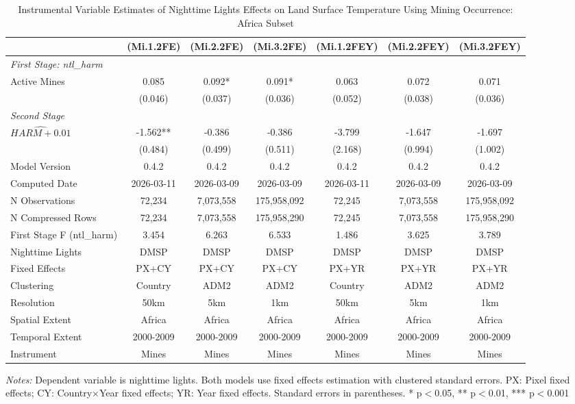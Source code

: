 \begin{table}[htbp]
\centering
\footnotesize
\caption{Instrumental Variable Estimates of Nighttime Lights Effects on Land Surface Temperature Using Mining Occurrence: Africa Subset}
\begin{tabular}{lcccccc}
\toprule
 & (Mi.1.2FE) & (Mi.2.2FE) & (Mi.3.2FE) & (Mi.1.2FEY) & (Mi.2.2FEY) & (Mi.3.2FEY) \\
\midrule
\midrule
\multicolumn{7}{l}{\textit{First Stage: ntl\_harm}} \\
  Active Mines & 0.085 & 0.092* & 0.091* & 0.063 & 0.072 & 0.071 \\
 & (0.046) & (0.037) & (0.036) & (0.052) & (0.038) & (0.036) \\
\midrule
\multicolumn{7}{l}{\textit{Second Stage}} \\
$\hat{HARM + 0.01}$ & -1.562** & -0.386 & -0.386 & -3.799 & -1.647 & -1.697 \\
 & (0.484) & (0.499) & (0.511) & (2.168) & (0.994) & (1.002) \\
\midrule
Model Version & 0.4.2 & 0.4.2 & 0.4.2 & 0.4.2 & 0.4.2 & 0.4.2 \\
Computed Date & 2026-03-11 & 2026-03-09 & 2026-03-09 & 2026-03-11 & 2026-03-09 & 2026-03-09 \\
N Observations & 72,234 & 7,073,558 & 175,958,092 & 72,245 & 7,073,558 & 175,958,092 \\
N Compressed Rows & 72,234 & 7,073,558 & 175,958,290 & 72,245 & 7,073,558 & 175,958,290 \\
First Stage F (ntl\_harm) & 3.454 & 6.263 & 6.533 & 1.486 & 3.625 & 3.789 \\
\midrule
Nighttime Lights & DMSP & DMSP & DMSP & DMSP & DMSP & DMSP \\
Fixed Effects & PX+CY & PX+CY & PX+CY & PX+YR & PX+YR & PX+YR \\
Clustering & Country & ADM2 & ADM2 & Country & ADM2 & ADM2 \\
Resolution & 50km & 5km & 1km & 50km & 5km & 1km \\
Spatial Extent & Africa & Africa & Africa & Africa & Africa & Africa \\
Temporal Extent & 2000-2009 & 2000-2009 & 2000-2009 & 2000-2009 & 2000-2009 & 2000-2009 \\
Instrument & Mines & Mines & Mines & Mines & Mines & Mines \\
\bottomrule
\end{tabular}
\begin{threeparttable}
\begin{tablenotes}\small
\item \textit{Notes:} Dependent variable is nighttime lights. Both models use  fixed effects estimation with clustered standard errors. PX: Pixel fixed effects; CY: Country×Year fixed effects; YR: Year fixed effects. Standard errors in parentheses. * p$<$0.05, ** p$<$0.01, *** p$<$0.001
\end{tablenotes}
\end{threeparttable}
\end{table}